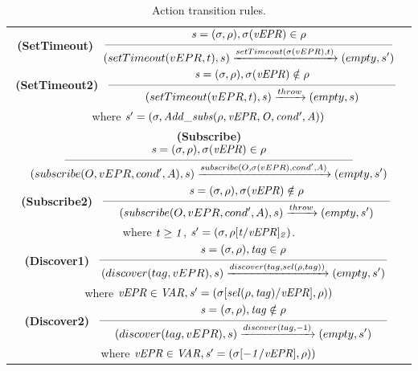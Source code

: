 \begin{table}[!h]
{{\begin{tabular}{c}
\\[0.5cm]

\textbf{(SetTimeout)}
$\reglaa{ %
{\it s=(\sigma,\rho), \sigma(vEPR) \in \rho}
}
{ %
(setTimeout(vEPR,t), s)
\xrightarrow{setTimeout(\sigma(vEPR),t)}
(empty,s')
}{9}$

\\[0.5cm]

\textbf{(SetTimeout2)}
$\reglaa{ %
{\it s=(\sigma,\rho), \sigma(vEPR)\notin \rho}
}
{ %
(setTimeout(vEPR,t), s)
\xrightarrow{throw}
(empty,s)
}{9}$
\\[0.4cm]
where ${\it s'=(\sigma,Add\_subs(\rho,vEPR,O,cond',A))}$

\\[0.5cm]

\textbf{(Subscribe)}
$\reglaa{ %
{\it s=(\sigma,\rho), \sigma(vEPR) \in \rho}
}
{ %
(subscribe(O,vEPR,cond',A),s)
\xrightarrow{subscribe(O,\sigma(vEPR),cond',A)}
(empty,s')
}{9}$

\\[0.5cm]

\textbf{(Subscribe2)}
$\reglaa{ %
{\it s=(\sigma,\rho), \sigma(vEPR) \notin \rho}
}
{ %
(subscribe(O,vEPR,cond',A),s)
\xrightarrow{throw}
(empty,s')
}{9}$\\[0.4cm]
where  ${\it t\geq1}$,$\ {\it s'=(\sigma,\rho[t/vEPR]_2)}$.

\\[0.5cm]


\textbf{(Discover1)}
$\reglaa{ %
{\it s=(\sigma,\rho), tag \in \rho}
}
{ %
(discover(tag,vEPR),s)
\xrightarrow{discover(tag,sel(\rho,tag))}
(empty,s')
}{9}$\\[0.4cm]
where ${\it vEPR \in VAR, s'=(\sigma[sel(\rho,tag)/vEPR],\rho))}$ 

\\[0.5cm]

\textbf{(Discover2)}
$\reglaa{ %
{\it s=(\sigma,\rho), tag \notin \rho}
}
{ %
(discover(tag,vEPR),s)
\xrightarrow{discover(tag,-1)}
(empty,s')
}{9}$\\[0.4cm]

where ${\it vEPR \in VAR, s'=(\sigma[-1/vEPR],\rho))}$

\end{tabular}
}
}
\vspace{-0.3cm}
\caption{\label{tran1}Action transition rules.}

\end{table}


